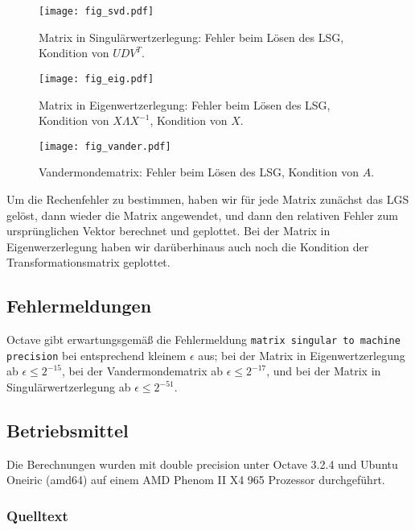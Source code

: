\documentclass{scrartcl}
\begin{document}
\begin{figure}[!htb]
\centering
\texttt{[image: fig\_svd.pdf]}
\caption{Matrix in Singulärwertzerlegung: Fehler beim Lösen des LSG, Kondition von \(UDV^T\). }
\label{fig:svd}
\end{figure}

\begin{figure}[!htb]
\centering
\texttt{[image: fig\_eig.pdf]}
\caption{Matrix in Eigenwertzerlegung: Fehler beim Lösen des LSG, Kondition von \(X \Lambda X^{-1}\), Kondition von \(X\). }
\label{fig:eig}
\end{figure}

\begin{figure}[!htb]
\centering
\texttt{[image: fig\_vander.pdf]}
\caption{Vandermondematrix: Fehler beim Lösen des LSG, Kondition von \(A\). }
\label{fig:vander}
\end{figure}

Um die Rechenfehler zu bestimmen, haben wir für jede Matrix zunächst das LGS
gelöst, dann wieder die Matrix angewendet, und dann den relativen Fehler zum
ursprünglichen Vektor berechnet und geplottet.  Bei der Matrix in
Eigenwerzerlegung haben wir darüberhinaus auch noch die Kondition der
Transformationsmatrix geplottet.

\subsection{Fehlermeldungen}

Octave gibt erwartungsgemäß die Fehlermeldung \texttt{matrix singular to
machine precision} bei entsprechend kleinem \(\epsilon\) aus; bei der Matrix in
Eigenwertzerlegung ab \(\epsilon \leq 2^{-15}\), bei der Vandermondematrix ab
\(\epsilon \leq 2^{-17}\), und bei der Matrix in Singulärwertzerlegung ab
\(\epsilon \leq 2^{-51}\).

\subsection{Betriebsmittel}

Die Berechnungen wurden mit double precision unter Octave 3.2.4 und Ubuntu
Oneiric (amd64) auf einem AMD Phenom II X4 965 Prozessor durchgeführt.

\subsubsection{Quelltext}











\end{document}
